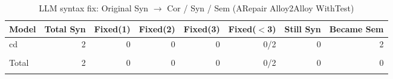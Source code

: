 \begin{table}[h]
\centering
\caption{LLM syntax fix: Original Syn $\rightarrow$ Cor / Syn / Sem (ARepair Alloy2Alloy WithTest)}
\label{tab:syn_fix_arepairalloy2alloywithtest}
\begin{tabular}{|l|r|r|r|r|r|r|r|}
\hline
Model & Total Syn & Fixed(1) & Fixed(2) & Fixed(3) & Fixed($<$3) & Still Syn & Became Sem \\
\hline
cd & 2 & 0 & 0 & 0 & 0/2 & 0 & 2 \\\\
\hline
Total & 2 & 0 & 0 & 0 & 0/2 & 0 & 0 \\\\
\hline
\end{tabular}
\end{table}

